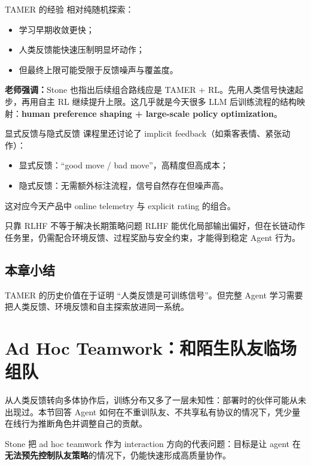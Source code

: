 \documentclass[a4paper]{article}
\begin{document}
\begin{importantbox}{TAMER 的经验}
相对纯随机探索：
\begin{itemize}
    \item 学习早期收敛更快；
    \item 人类反馈能快速压制明显坏动作；
    \item 但最终上限可能受限于反馈噪声与覆盖度。
\end{itemize}
\end{importantbox}

\textbf{老师强调：}Stone 也指出后续组合路线应是 TAMER + RL。先用人类信号快速起步，再用自主 RL 继续提升上限。这几乎就是今天很多 LLM 后训练流程的结构映射：\textbf{human preference shaping + large-scale policy optimization}。

\begin{knowledgebox}{显式反馈与隐式反馈}
课程里还讨论了 implicit feedback（如乘客表情、紧张动作）：
\begin{itemize}
    \item 显式反馈：``good move / bad move''，高精度但高成本；
    \item 隐式反馈：无需额外标注流程，信号自然存在但噪声高。
\end{itemize}
这对应今天产品中 online telemetry 与 explicit rating 的组合。
\end{knowledgebox}

\begin{warningbox}{只靠 RLHF 不等于解决长期策略问题}
RLHF 能优化局部输出偏好，但在长链动作任务里，仍需配合环境反馈、过程奖励与安全约束，才能得到稳定 Agent 行为。
\end{warningbox}

\subsection{本章小结}
TAMER 的历史价值在于证明 ``人类反馈是可训练信号''。但完整 Agent 学习需要把人类反馈、环境反馈和自主探索放进同一系统。

\section{Ad Hoc Teamwork：和陌生队友临场组队}

从人类反馈转向多体协作后，训练分布又多了一层未知性：部署时的伙伴可能从未出现过。本节回答 Agent 如何在不重训队友、不共享私有协议的情况下，凭少量在线行为推断角色并调整自己的贡献。

Stone 把 ad hoc teamwork 作为 interaction 方向的代表问题：目标是让 agent 在\textbf{无法预先控制队友策略}的情况下，仍能快速形成高质量协作。
\end{document}
